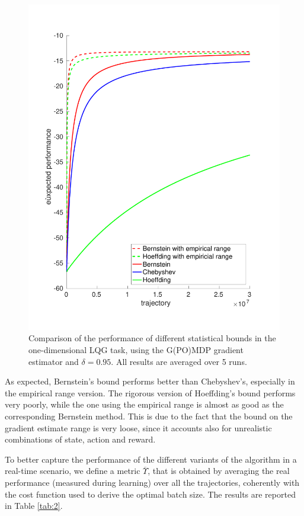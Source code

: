 \begin{figure}[t!]
\includegraphics[width = 1.0\textwidth]{Images/compare_bounds.pdf}
\caption[Comparison of the performance of different statistical bounds in the one-dimensional LQG task.]{Comparison of the performance of different statistical bounds in the one-dimensional \ac{LQG} task, using the G(PO)MDP gradient estimator and $\delta=0.95$. All results are averaged over 5 runs.}
\label{fig:2}
\end{figure}

As expected, Bernstein's bound performs better than Chebyshev's, especially in the empirical range version. The rigorous version of Hoeffding's bound performs very poorly, while the one using the empirical range is almost as good as the corresponding Bernstein method. This is due to the fact that the bound on the gradient estimate range is very loose, since it accounts also for unrealistic combinations of state, action and reward.

To better capture the performance of the different variants of the algorithm in a real-time scenario, we define a metric $\overline{\Upsilon}$, that is obtained by averaging the real performance (measured during learning) over all the trajectories, coherently with the cost function used to derive the optimal batch size. The results are reported in Table \ref{tab:2}.

